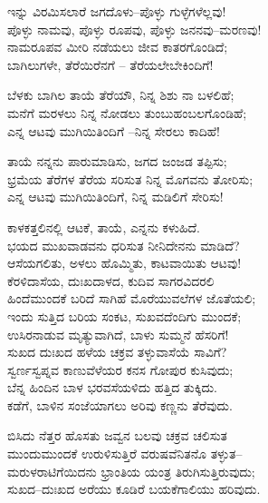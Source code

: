 \begin{myquote}
ಇನ್ನು ವಿರಮಿಸಲಾರೆ ಜಗದೊಳು–ಪೊಳ್ಳು ಗುಳ್ಳೆಗಳೆಲ್ಲವು!\\ಪೊಳ್ಳು ನಾಮವು, ಪೊಳ್ಳು ರೂಪವು, ಪೊಳ್ಳು ಜನನವು–ಮರಣವು!\\ನಾಮರೂಪವ ಮೀರಿ ನಡೆಯಲು ಜೀವ ಕಾತರಗೊಂಡಿದೆ;\\ಬಾಗಿಲುಗಳೇ, ತೆರೆಯಿರೆನಗೆ – ತೆರೆಯಲೇಬೇಕಿಂದಿಗೆ!
\end{myquote}

\begin{myquote}
ಬೆಳಕು ಬಾಗಿಲ ತಾಯೆ ತೆರೆಯೌ, ನಿನ್ನ ಶಿಶು ನಾ ಬಳಲಿಹೆ;\\ಮನೆಗೆ ಮರಳಲು ನಿನ್ನ ನೋಡಲು ತುಂಬುಹಂಬಲಗೊಂಡಿಹೆ;\\ಎನ್ನ ಆಟವು ಮುಗಿಯಿತಿಂದಿಗೆ –ನಿನ್ನ ಸೇರಲು ಕಾದಿಹೆ!
\end{myquote}

\begin{myquote}
ತಾಯೆ ನನ್ನನು ಪಾರುಮಾಡಿಸು, ಜಗದ ಜಂಜಡ ತಪ್ಪಿಸು;\\ಭ್ರಮೆಯ ತೆರೆಗಳ ತೆರೆಯ ಸರಿಸುತ ನಿನ್ನ ಮೊಗವನು ತೋರಿಸು;\\ಎನ್ನ ಆಟವು ಮುಗಿಯಿತಿಂದಿಗೆ, ನಿನ್ನ ಮಡಿಲಿಗೆ ಸೇರಿಸು!
\end{myquote}

\begin{myquote}
ಕಾಳಕತ್ತಲಿನಲ್ಲಿ ಆಟಕೆ, ತಾಯೆ, ಎನ್ನನು ಕಳುಹಿದೆ.\\ಭಯದ ಮುಖವಾಡವನು ಧರಿಸುತ ನೀನಿದೇನನು ಮಾಡಿದೆ?\\ಆಸೆಯಗಲಿತು, ಅಳಲು ಹೊಮ್ಮಿತು, ಕಾಟವಾಯಿತು ಆಟವು!\\ಕೆರಳಿದಾಸೆಯ, ದುಃಖದಾಳದ, ಕುದಿವ ಸಾಗರವಿದರಲಿ\\ಹಿಂದೆಮುಂದಕೆ ಬರಿದೆ ಸಾಗಿಹೆ ಮೊರೆಯುವಲೆಗಳ ಜೊತೆಯಲಿ;\\ಇಂದು ಸುತ್ತಿದ ಬರಿಯ ಸಂಕಟ, ಸುಖವದೆಂದಿಗು ಮುಂದಕೆ;\\ಉಸಿರನಾಡುವ ಮೃತ್ಯುವಾಗಿದೆ, ಬಾಳು ಸುಮ್ಮನೆ ಹೆಸರಿಗೆ!\\ಸುಖದ ದುಃಖದ ಹಳೆಯ ಚಕ್ರವ ತಳ್ಳುವಾಸೆಯೆ ಸಾವಿಗೆ?\\ಸ್ವರ್ಣಸ್ವಪ್ನವ ಕಾಣುವೆಳೆಯರ ಕನಸ ಗೋಪುರ ಕುಸಿವುದು;\\ಬೆನ್ನ ಹಿಂದಿನ ಬಾಳ ಭರವಸೆಯಳಿದು ಹತ್ತಿದ ತುಕ್ಕಿದು.\\ಕಡೆಗೆ, ಬಾಳಿನ ಸಂಜೆಯಾಗಲು ಅರಿವು ಕಣ್ಣನು ತೆರೆವುದು.
\end{myquote}

\begin{myquote}
ಬಿಸಿದು ನೆತ್ತರ ಹೊಸತು ಜವ್ವನ ಬಲವು ಚಕ್ರವ ಚಲಿಸುತ\\ಮುಂದುಮುಂದಕೆ ಉರುಳಿಸುತ್ತಿರೆ ವರುಷವೆನಿತನೊ ತಳ್ಳುತ–\\ಮರುಳರಾಟಿಗೆಯಿದನು ಭ್ರಾಂತಿಯ ಯಂತ್ರ ತಿರುಗಿಸುತ್ತಿರುವುದು;\\ಸುಖದ–ದುಃಖದ ಅರೆಯು ಕೂಡಿರೆ ಬಯಕೆಗಾಲಿಯು ಹರಿವುದು.
\end{myquote}

